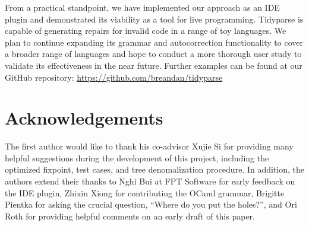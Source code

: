 \documentclass[sigplan,nonacm]{acmart}\settopmatter{printfolios=false,printccs=false,printacmref=false}
\begin{document}
From a practical standpoint, we have implemented our approach as an IDE plugin and demonstrated its viability as a tool for live programming. Tidyparse is capable of generating repairs for invalid code in a range of toy languages. We plan to continue expanding its grammar and autocorrection functionality to cover a broader range of languages and hope to conduct a more thorough user study to validate its effectiveness in the near future. Further examples can be found at our GitHub repository: \url{https://github.com/breandan/tidyparse}

\section{Acknowledgements}
The first author would like to thank his co-advisor Xujie Si for providing many helpful suggestions during the development of this project, including the optimized fixpoint, test cases, and tree denomalization procedure. In addition, the authors extend their thanks to Nghi Bui at FPT Software for early feedback on the IDE plugin, Zhixin Xiong for contributing the OCaml grammar, Brigitte Pientka for asking the crucial question, ``Where do you put the holes?'', and Ori Roth for providing helpful comments on an early draft of this paper.

\end{document}
